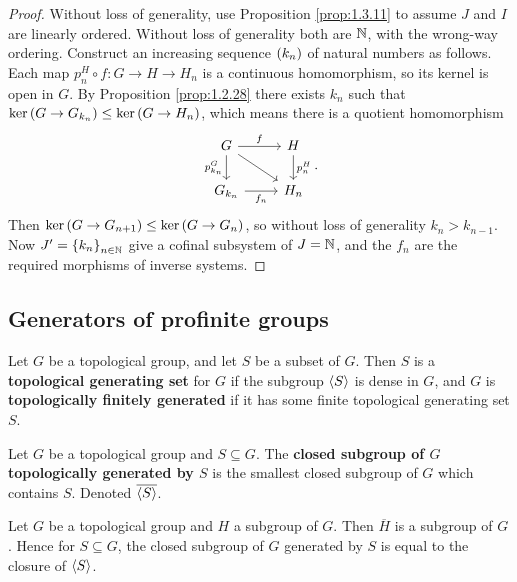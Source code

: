 \begin{proof}
Without loss of generality, use Proposition \ref{prop:1.3.11} to assume $ J $ and $ I $ are linearly ordered. Without loss of generality both are $ \mathbb{N} $, with the wrong-way ordering. Construct an increasing sequence $ \br{k_n} $ of natural numbers as follows. Each map $ p_n^H \circ f : G \to H \to H_n $ is a continuous homomorphism, so its kernel is open in $ G $. By Proposition \ref{prop:1.2.28} there exists $ k_n $ such that $ \ker \br{G \to G_{k_n}} \le \ker \br{G \to H_n} $, which means there is a quotient homomorphism
$$
\begin{tikzcd}
G \arrow{r}{f} \arrow{d}[swap]{p_{k_n}^G} \arrow{dr} & H \arrow{d}{p_n^H} \\
G_{k_n} \arrow{r}[swap]{f_n} & H_n
\end{tikzcd}.
$$
Then $ \ker \br{G \to G_{n + 1}} \le \ker \br{G \to G_n} $, so without loss of generality $ k_n > k_{n - 1} $. Now $ J' = \cbr{k_n}_{n \in \NN} $ give a cofinal subsystem of $ J = \mathbb{N} $, and the $ f_n $ are the required morphisms of inverse systems.
\end{proof}

\pagebreak

\subsection{Generators of profinite groups}

\begin{definition}
Let $ G $ be a topological group, and let $ S $ be a subset of $ G $. Then $ S $ is a \textbf{topological generating set} for $ G $ if the subgroup $ \left\langle S \right\rangle $ is dense in $ G $, and $ G $ is \textbf{topologically finitely generated} if it has some finite topological generating set $ S $.
\end{definition}

\begin{definition}
Let $ G $ be a topological group and $ S \subseteq G $. The \textbf{closed subgroup of $ G $ topologically generated by $ S $} is the smallest closed subgroup of $ G $ which contains $ S $. Denoted $ \overline{\left\langle S \right\rangle} $.
\end{definition}

\begin{proposition}
Let $ G $ be a topological group and $ H $ a subgroup of $ G $. Then $ \overline{H} $ is a subgroup of $ G $. Hence for $ S \subseteq G $, the closed subgroup of $ G $ generated by $ S $ is equal to the closure of $ \left\langle S \right\rangle $.
\end{proposition}

